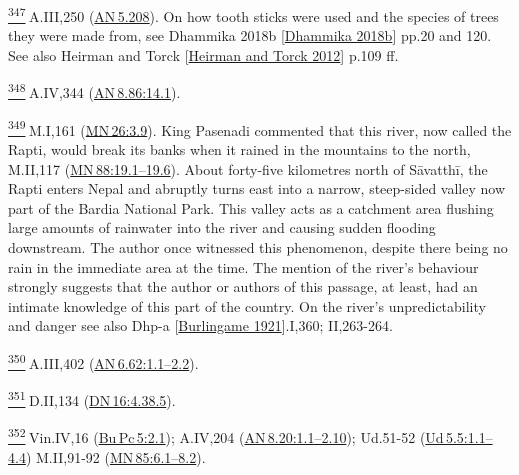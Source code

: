 \label{footprints_split_024.html_fn347}
\hyperref[footprints_split_011.htmlux5cux23fnref347]{\textsuperscript{347}} A.III,250
(\href{https://suttacentral.net/an5.208/en/sujato}{AN\,5.208}). On how
tooth sticks were used and the species of trees they were made from, see
{Dhammika 2018b
{{[}\hyperref[footprints_split_022.htmlux5cux23Dhammikaux5cux25202018b]{Dhammika
2018b}{]}}} pp.20 and 120. See also {Heirman and Torck
{{[}\hyperref[footprints_split_022.htmlux5cux23Heirmanux5cux2520andux5cux2520Torckux5cux25202012]{Heirman
and Torck 2012}{]}}} p.109 ff.

\label{footprints_split_024.html_fn348}
\hyperref[footprints_split_011.htmlux5cux23fnref348]{\textsuperscript{348}} A.IV,344
(\href{https://suttacentral.net/an8.86/en/sujato\#14.1}{AN\,8.86:14.1}).

\label{footprints_split_024.html_fn349}
\hyperref[footprints_split_011.htmlux5cux23fnref349]{\textsuperscript{349}} M.I,161
(\href{https://suttacentral.net/mn26/en/sujato\#3.9}{MN\,26:3.9}). King
Pasenadi commented that this river, now called the Rapti, would break
its banks when it rained in the mountains to the north, M.II,117
(\href{https://suttacentral.net/mn88/en/sujato\#19.1}{MN\,88:19.1--19.6}).
About forty-five kilometres north of Sāvatthī, the Rapti enters Nepal
and abruptly turns east into a narrow, steep-sided valley now part of
the Bardia National Park. This valley acts as a catchment area flushing
large amounts of rainwater into the river and causing sudden flooding
downstream. The author once witnessed this phenomenon, despite there
being no rain in the immediate area at the time. The mention of the
river's behaviour strongly suggests that the author or authors of this
passage, at least, had an intimate knowledge of this part of the
country. On the river's unpredictability and danger see also {Dhp-a
{{[}\hyperref[footprints_split_023.htmlux5cux23Burlingameux5cux25201921]{Burlingame
1921}{]}}}.I,360; II,263-264.

\label{footprints_split_024.html_fn350}
\hyperref[footprints_split_011.htmlux5cux23fnref350]{\textsuperscript{350}} A.III,402
(\href{https://suttacentral.net/an6.62/en/sujato\#1.1}{AN\,6.62:1.1--2.2}).

\label{footprints_split_024.html_fn351}
\hyperref[footprints_split_011.htmlux5cux23fnref351]{\textsuperscript{351}} D.II,134
(\href{https://suttacentral.net/dn16/en/sujato\#4.38.5}{DN\,16:4.38.5}).

\label{footprints_split_024.html_fn352}
\hyperref[footprints_split_011.htmlux5cux23fnref352]{\textsuperscript{352}} Vin.IV,16
(\href{https://suttacentral.net/pli-tv-bu-vb-pc5/en/brahmali\#2.1}{Bu\,Pc\,5:2.1});
A.IV,204
(\href{https://suttacentral.net/an8.20/en/sujato\#1.1}{AN\,8.20:1.1--2.10});
Ud.51-52
(\href{https://suttacentral.net/ud5.5/en/sujato\#1.1}{Ud\,5.5:1.1--4.4})
M.II,91-92
(\href{https://suttacentral.net/mn85/en/sujato\#6.1}{MN\,85:6.1--8.2}).

